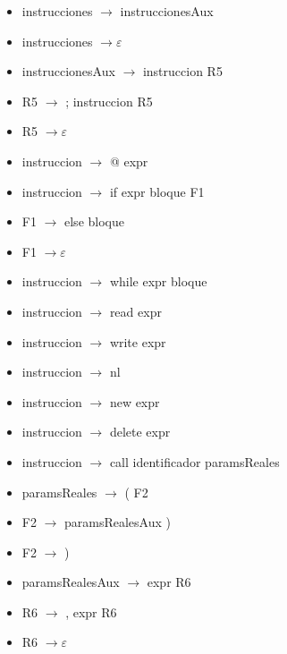 \documentclass[11pt]{article}
\begin{document}
        \begin{itemize}
            \item instrucciones $\rightarrow$ instruccionesAux
            \item instrucciones $\rightarrow \varepsilon$
            \item instruccionesAux $\rightarrow$ instruccion R5
            \item R5 $\rightarrow$ ; instruccion R5
            \item R5 $\rightarrow \varepsilon$
            \item instruccion $\rightarrow$ @ expr
            \item instruccion $\rightarrow$ if expr bloque F1
            \item F1 $\rightarrow$ else bloque
            \item F1 $\rightarrow \varepsilon$
            \item instruccion $\rightarrow$ while expr bloque
            \item instruccion $\rightarrow$ read expr
            \item instruccion $\rightarrow$ write expr 
            \item instruccion $\rightarrow$ nl
            \item instruccion $\rightarrow$ new expr
            \item instruccion $\rightarrow$ delete expr
            \item instruccion $\rightarrow$ call identificador paramsReales
            \item paramsReales $\rightarrow$ ( F2
            \item F2 $\rightarrow$ paramsRealesAux )
            \item F2 $\rightarrow$ )
            \item paramsRealesAux $\rightarrow$ expr R6
            \item R6 $\rightarrow$ , expr R6
            \item R6 $\rightarrow \varepsilon$
        \end{itemize}
        \
\end{document}
